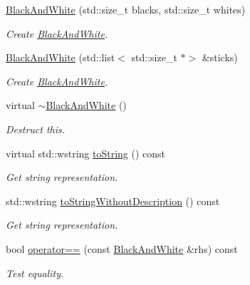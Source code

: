 \begin{DoxyCompactItemize}
\item 
\hyperlink{classmastermind_1_1logic_1_1_black_and_white_a4dbd770b9f1ba3bef45ebba9fc01dcf4}{Black\+And\+White} (std\+::size\+\_\+t blacks, std\+::size\+\_\+t whites)
\begin{DoxyCompactList}\small\item\em Create \hyperlink{classmastermind_1_1logic_1_1_black_and_white}{Black\+And\+White}. \end{DoxyCompactList}\item 
\hyperlink{classmastermind_1_1logic_1_1_black_and_white_a4ddf35a30c296bb2453cffc833ea20e8}{Black\+And\+White} (std\+::list$<$ std\+::size\+\_\+t $\ast$$>$ \&sticks)
\begin{DoxyCompactList}\small\item\em Create \hyperlink{classmastermind_1_1logic_1_1_black_and_white}{Black\+And\+White}. \end{DoxyCompactList}\item 
virtual \hyperlink{classmastermind_1_1logic_1_1_black_and_white_aba480247d6d6b92e190b427f95781202}{$\sim$\+Black\+And\+White} ()
\begin{DoxyCompactList}\small\item\em Destruct this. \end{DoxyCompactList}\item 
virtual std\+::wstring \hyperlink{classmastermind_1_1logic_1_1_black_and_white_aaa1108efb71702c9cdf6ac9a9ad4a0c9}{to\+String} () const
\begin{DoxyCompactList}\small\item\em Get string representation. \end{DoxyCompactList}\item 
std\+::wstring \hyperlink{classmastermind_1_1logic_1_1_black_and_white_a38779882fc72d356a660026e047eafb9}{to\+String\+Without\+Description} () const
\begin{DoxyCompactList}\small\item\em Get string representation. \end{DoxyCompactList}\item 
bool \hyperlink{classmastermind_1_1logic_1_1_black_and_white_ade7da8e1b846896a978f619b9689a7cb}{operator==} (const \hyperlink{classmastermind_1_1logic_1_1_black_and_white}{Black\+And\+White} \&rhs) const
\begin{DoxyCompactList}\small\item\em Test equality. \end{DoxyCompactList}\item 
$$
\end{DoxyCompactItemize}

